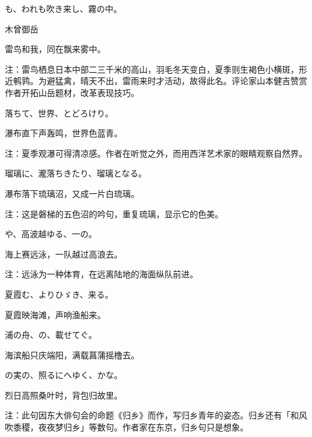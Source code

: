 \begin{haiku}
    {\FH {}も、われも吹き来し、霧の中。}

    {\FK 木曾御岳}

    {\FK 雷鸟和我，同在飘来雾中。}

    {\FT 注：雷鸟栖息日本中部二三千米的高山，羽毛冬天变白，夏季则生褐色小横斑，形近鹌鹑。为避猛禽，晴天不出，雷雨来时才活动，故得此名。评论家山本健吉赞赏作者开拓山岳题材，改革表现技巧。}
\end{haiku}

\begin{haiku}
    {\FH {}落ちて、世界、とどろけり。}

    {\FK 瀑布直下声轰鸣，世界色蓝青。}

    {\FT 注：夏季观瀑可得清凉感。作者在听觉之外，而用西洋艺术家的眼睛观察自然界。}
\end{haiku}

\begin{haiku}
    {\FH 瑠璃に、瀧落ちきたり、瑠璃となる。}

    {\FK 瀑布落下琉璃沼，又成一片白琉璃。}

    {\FT 注：这是磐梯的五色沼的吟句，重复琉璃，显示它的色美。}
\end{haiku}

\begin{haiku}
    {\FH {}や、高波越ゆる、一の。}

    {\FK 海上赛远泳，一队越过高浪去。}

    {\FT 注：远泳为一种体育，在远离陆地的海面纵队前进。}
\end{haiku}

\begin{haiku}
    {\FH 夏霞む、よりひゞき、来る。}

    {\FK 夏霞映海滩，声响渔船来。}
\end{haiku}

\begin{haiku}
    {\FH 浦の舟、の、載せてぐ。}

    {\FK 海滨船只庆端阳，满载菖蒲摇橹去。}
\end{haiku}

\begin{haiku}
    {\FH {}の実の、照るにへゆく、かな。}

    {\FK 烈日高照桑叶时，背包归故里。}

    {\FT 注：此句因东大俳句会的命题《归乡》而作，写归乡青年的姿态。归乡还有「和风吹黍稷，夜夜梦归乡」等数句。作者家在东京，归乡句只是想象。}
\end{haiku}

